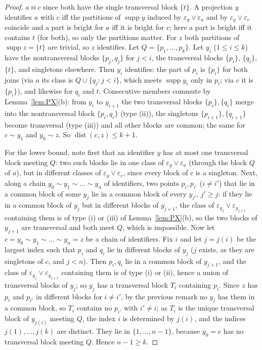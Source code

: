 \documentclass[11pt]{amsart}
\theoremstyle{definition}
\newcommand{\supp}{\operatorname{supp}}
\newcommand{\mt}{\bowtie}      %
\begin{document}
\begin{proof}
$a\mt c$ since both have the single transversal block $\{t\}$. A projection $y$ identifies $a$ with $c$ iff the partitions of $\supp y$ induced by $\varepsilon_y\vee\varepsilon_a$ and by $\varepsilon_y\vee\varepsilon_c$ coincide and a part is bright for $a$ iff it is bright for $c$; here a part is bright iff it contains $t$ (for both), so only the partitions matter. For $z$ both partitions of $\supp z=\{t\}$ are trivial, so $z$ identifies. Let $Q=\{p_1,\dots,p_k\}$. Let $y_i$ ($1\le i\le k$) have the nontransversal blocks $\{p_j,q_j\}$ for $j<i$, the transversal blocks $\{p_i\}$, $\{q_i\}$, $\{t\}$, and singletons elsewhere. Then $y_i$ identifies: the part of $p_i$ is $\{p_i\}$ for both joins (via $a$ its class is $Q\cup\{q_j:j<i\}$, which meets $\supp y_i$ only in $p_i$; via $c$ it is $\{p_i\}$), and likewise for $q_i$ and $t$. Consecutive members commute by Lemma~\ref{lem:PX}(b): from $y_i$ to $y_{i+1}$ the two transversal blocks $\{p_i\},\{q_i\}$ merge into the nontransversal block $\{p_i,q_i\}$ (type (ii)), the singletons $\{p_{i+1}\},\{q_{i+1}\}$ become transversal (type (iii)) and all other blocks are common; the same for $c\sim y_1$ and $y_k\sim z$. So $\operatorname{dist}(c,z)\le k+1$.

For the lower bound, note first that an identifier $y$ has at most one transversal block meeting $Q$: two such blocks lie in one class of $\varepsilon_y\vee\varepsilon_a$ (through the block $Q$ of $a$), but in different classes of $\varepsilon_y\vee\varepsilon_c$, since every block of $c$ is a singleton. Next, along a chain $y_0\sim y_1\sim\dots\sim y_n$ of identifiers, two points $p_i,p_{i'}$ ($i\ne i'$) that lie in a common block of some $y_j$ lie in a common block of every $y_{j'}$, $j'\ge j$: if they lie in a common block of $y_j$ but in different blocks of $y_{j+1}$, the class of $\varepsilon_{y_j}\vee\varepsilon_{y_{j+1}}$ containing them is of type (i) or (iii) of Lemma~\ref{lem:PX}(b), so the two blocks of $y_{j+1}$ are transversal and both meet $Q$, which is impossible. Now let $c=y_0\sim y_1\sim\dots\sim y_n=z$ be a chain of identifiers. Fix $i$ and let $j=j(i)$ be the largest index such that $p_i$ and $q_i$ lie in different blocks of $y_j$ ($j$ exists, as they are singletons of $c$, and $j<n$). Then $p_i,q_i$ lie in a common block of $y_{j+1}$, and the class of $\varepsilon_{y_j}\vee\varepsilon_{y_{j+1}}$ containing them is of type (i) or (ii), hence a union of transversal blocks of $y_j$; so $y_j$ has a transversal block $T_i$ containing $p_i$. Since $z$ has $p_i$ and $p_{i'}$ in different blocks for $i\ne i'$, by the previous remark no $y_j$ has them in a common block, so $T_i$ contains no $p_{i'}$ with $i'\ne i$; as $T_i$ is the unique transversal block of $y_{j(i)}$ meeting $Q$, the index $i$ is determined by $j(i)$, and the indices $j(1),\dots,j(k)$ are distinct. They lie in $\{1,\dots,n-1\}$, because $y_0=c$ has no transversal block meeting $Q$. Hence $n-1\ge k$.
\end{proof}
\end{document}
